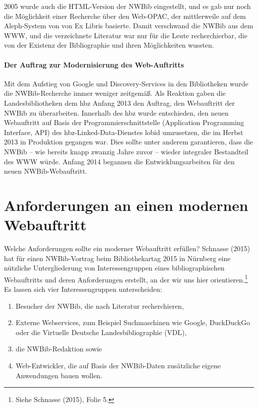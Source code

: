 \documentclass[a4paper,
fontsize=11pt,
oneside,
numbers=noperiodatend,
parskip=half-,
bibliography=totoc,
final
]{scrartcl}
\providecommand{\tightlist}{%
  \setlength{\itemsep}{0pt}\setlength{\parskip}{0pt}}
\begin{document}
2005 wurde auch die HTML-Version der NWBib eingestellt, und es gab nur
noch die Möglichkeit einer Recherche über den Web-OPAC, der mittlerweile
auf dem Aleph-System von von Ex Libris basierte. Damit verschwand die
NWBib aus dem WWW, und die verzeichnete Literatur war nur für die Leute
recherchierbar, die von der Existenz der Bibliographie und ihren
Möglichkeiten wussten.

\paragraph{Der Auftrag zur Modernisierung des
Web-Auftritts}\label{der-auftrag-zur-modernisierung-des-web-auftritts}

Mit dem Aufstieg von Google und Dis\-covery-Services in den Bibliotheken
wurde die NWBib-Recherche immer weniger zeitgemäß. Als Reaktion gaben
die Landesbibliotheken dem hbz Anfang 2013 den Auftrag, den Webauftritt
der NWBib zu überarbeiten. Innerhalb des hbz wurde entschieden, den
neuen Webauftritt auf Basis der Programmierschnittstelle (Application
Programming Interface, API) des hbz-Linked-Data-Dienstes lobid
umzusetzen, die im Herbst 2013 in Produktion gegangen war. Dies sollte
unter anderem garantieren, dass die NWBib -- wie bereits knapp zwanzig
Jahre zuvor -- wieder integraler Bestandteil des WWW würde. Anfang 2014
begannen die Entwicklungsarbeiten für den neuen NWBib-Webauftritt.

\section*{Anforderungen an einen modernen
Webauftritt}\label{anforderungen-an-einen-modernen-webauftritt}

Welche Anforderungen sollte ein moderner Webauftritt erfüllen? Schnasse
(2015) hat für einen NWBib-Vortrag beim Bibliothekartag 2015 in Nürnberg
eine nützliche Untergliederung von Interessengruppen eines
bibliographischen Webauftritts und deren Anforderungen erstellt, an der
wir uns hier orientieren.\footnote{Siehe Schnasse (2015), Folie 5.} Es
lassen sich vier Interessengruppen unterscheiden:

\begin{enumerate}
\def\labelenumi{\arabic{enumi}.}
\tightlist
\item
  Besucher der NWBib, die nach Literatur recherchieren,
\item
  Externe Webservices, zum Beispiel Suchmaschinen wie Google, DuckDuckGo
  oder die Virtuelle Deutsche Landesbibliographie (VDL),
\item
  die NWBib-Redaktion sowie
\item
  Web-Entwickler, die auf Basis der NWBib-Daten zusätzliche eigene
  Anwendungen bauen wollen.
\end{enumerate}
\end{document}
